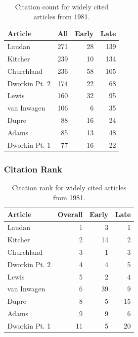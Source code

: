 \documentclass[
  10pt,
  letterpaper,
  DIV=11,
  numbers=noendperiod,
  twoside]{scrartcl}
\begin{document}
\begin{longtable}[]{@{}lrrr@{}}

\caption{\label{tbl-citation-count-1981}Citation count for widely cited
articles from 1981.}

\tabularnewline

\toprule\noalign{}
Article & All & Early & Late \\
\midrule\noalign{}
\endhead
\bottomrule\noalign{}
\endlastfoot
Laudan & 271 & 28 & 139 \\
Kitcher & 239 & 10 & 134 \\
Churchland & 236 & 58 & 105 \\
Dworkin Pt. 2 & 174 & 22 & 68 \\
Lewis & 160 & 32 & 95 \\
van Inwagen & 106 & 6 & 35 \\
Dupre & 88 & 16 & 24 \\
Adams & 85 & 13 & 48 \\
Dworkin Pt. 1 & 77 & 16 & 22 \\

\end{longtable}

\subsubsection*{Citation Rank}\label{sec-rank-1981}

\begin{longtable}[]{@{}lrrr@{}}

\caption{\label{tbl-citation-rank-1981}Citation rank for widely cited
articles from 1981.}

\tabularnewline

\toprule\noalign{}
Article & Overall & Early & Late \\
\midrule\noalign{}
\endhead
\bottomrule\noalign{}
\endlastfoot
Laudan & 1 & 3 & 1 \\
Kitcher & 2 & 14 & 2 \\
Churchland & 3 & 1 & 3 \\
Dworkin Pt. 2 & 4 & 4 & 5 \\
Lewis & 5 & 2 & 4 \\
van Inwagen & 6 & 39 & 9 \\
Dupre & 8 & 5 & 15 \\
Adams & 9 & 9 & 6 \\
Dworkin Pt. 1 & 11 & 5 & 20 \\

\end{longtable}
\end{document}
